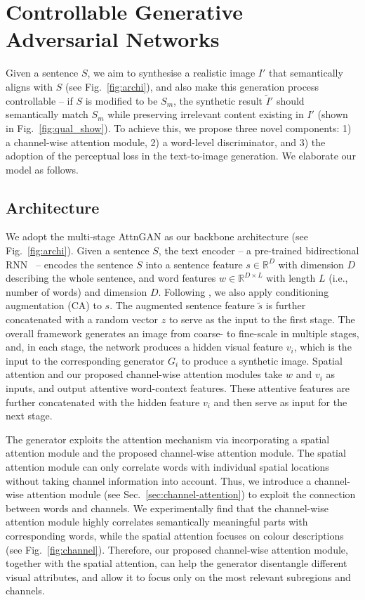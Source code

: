 \documentclass{article}
\begin{document}
\section{Controllable Generative Adversarial Networks}
\label{controlGAN}

Given a sentence $S$, we aim to synthesise a realistic image ${I}'$ that semantically aligns with $S$ (see Fig.~\ref{fig:archi}), and also make this generation process controllable -- if $S$ is modified to be $S_m$, the synthetic result ${\tilde{I}}'$ should semantically match $S_m$ while preserving irrelevant content existing in ${I}'$ (shown in Fig.~\ref{fig:qual_show}). To achieve this, we propose three novel components: 1) a channel-wise attention module, 2) a word-level discriminator, and 3) the adoption of the perceptual loss in the text-to-image generation. We elaborate our model as follows.  

\subsection{Architecture}

We adopt the multi-stage AttnGAN \cite{xu2018attngan} as our backbone architecture (see Fig.~\ref{fig:archi}).
Given a sentence $S$, the text encoder -- a pre-trained bidirectional RNN~\cite{xu2018attngan} --
encodes the sentence $S$ into a sentence feature $s \in \mathbb{R}^{D}$ with dimension $D$ describing the whole sentence, and word features $w \in \mathbb{R}^{{D}\times L}$ with length $L$ (i.e., number of words) and dimension $D$.  
Following \cite{zhang2017stackgan}, we also apply conditioning augmentation (CA) to $s$.
The augmented sentence feature $\tilde{s}$ is further concatenated with a random vector $z$ to serve as the input to the first stage. 
The overall framework generates an image from coarse- to fine-scale in multiple stages, and, in each stage, the network produces a hidden visual feature $v_i$, which is the input to the corresponding generator $G_i$ to produce a synthetic image.
Spatial attention \cite{xu2018attngan} and our proposed channel-wise attention modules {take $w$ and $v_i$ as inputs}, and output attentive word-context features.
These attentive features are further concatenated with the hidden feature $v_i$ and then serve as input for the next stage.

The generator exploits the attention mechanism via incorporating a spatial attention module \cite{xu2018attngan} and the proposed channel-wise attention module. The spatial attention module \cite{xu2018attngan} can only correlate words with individual spatial locations without taking channel information into account.
Thus, we introduce a channel-wise attention module (see Sec.~\ref{sec:channel-attention}) {to exploit the connection between words and channels}.
We experimentally find that the channel-wise attention module highly correlates semantically meaningful parts with corresponding words, while the spatial attention focuses on colour descriptions (see Fig.~\ref{fig:channel}).
{Therefore,} {our proposed channel-wise attention module, together with the spatial attention}, can help the generator disentangle different visual attributes, and allow it to focus {only} on the most relevant subregions and channels.
\end{document}
